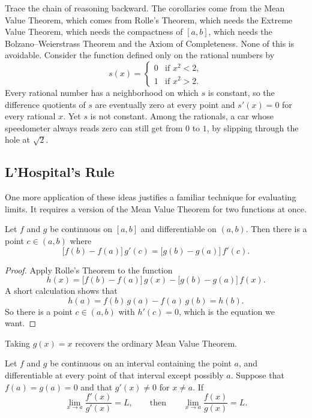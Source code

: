   Trace the chain of reasoning backward.  The corollaries come from the Mean Value Theorem, which comes from Rolle's Theorem, which needs the Extreme Value Theorem, which needs the compactness of $[a,b]$, which needs the Bolzano--Weierstrass Theorem and the Axiom of Completeness.  None of this is avoidable.  Consider the function defined only on the rational numbers by
\begin{displaymath}
   s(x) = \left\{
     \begin{array}{ll}
       0 & \text{if } x^2 < 2, \\
       1 & \text{if } x^2 > 2.
     \end{array}
   \right.
\end{displaymath}
Every rational number has a neighborhood on which $s$ is constant, so the difference quotients of $s$ are eventually zero at every point and $s'(x) = 0$ for every rational $x$.  Yet $s$ is not constant.  Among the rationals, a car whose speedometer always reads zero can still get from $0$ to $1$, by slipping through the hole at $\sqrt2$.

\subsection{L'Hospital's Rule}

One more application of these ideas justifies a familiar technique for evaluating limits.  It requires a version of the Mean Value Theorem for two functions at once.

\begin{theorem}\label{thm:gmvt}
Let $f$ and $g$ be continuous on $[a,b]$ and differentiable on $(a,b)$.  Then there is a point $c \in (a,b)$ where
\[ \big[f(b) - f(a)\big]\,g'(c) = \big[g(b) - g(a)\big]\,f'(c). \]
\end{theorem}

\begin{proof}
Apply Rolle's Theorem to the function
\[ h(x) = \big[f(b) - f(a)\big]\,g(x) - \big[g(b) - g(a)\big]\,f(x). \]
A short calculation shows that
\[ h(a) = f(b)\,g(a) - f(a)\,g(b) = h(b). \]
So there is a point $c \in (a,b)$ with $h'(c) = 0$, which is the equation we want.
\end{proof}

Taking $g(x) = x$ recovers the ordinary Mean Value Theorem.

\begin{theorem}\label{thm:lhospital}
Let $f$ and $g$ be continuous on an interval containing the point $a$, and differentiable at every point of that interval except possibly $a$.  Suppose that $f(a) = g(a) = 0$ and that $g'(x) \neq 0$ for $x \neq a$.  If
\[ \lim_{x \to a} \frac{f'(x)}{g'(x)} = L, \qquad \text{then} \qquad \lim_{x \to a} \frac{f(x)}{g(x)} = L. \]
\end{theorem}

